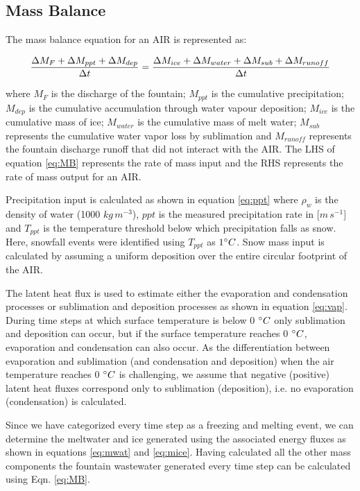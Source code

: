 \documentclass[utf8]{frontiersSCNS} %
\begin{document}
\subsection{Mass Balance}
The mass balance equation for an AIR is represented as:

\begin{equation}
	\frac{\Delta M_{F} + \Delta M_{ppt} + \Delta M_{dep}}{\Delta t} = \frac{\Delta M_{ice} +\Delta M_{water} +
		\Delta M_{sub} + \Delta M_{runoff}}{\Delta t}  \\
	\label{eq:MB}
\end{equation}

where $M_{F}$ is the discharge of the fountain; $M_{ppt}$ is the cumulative precipitation;  $M_{dep}$ is the cumulative
accumulation through water vapour deposition; $M_{ice}$ is the cumulative mass of ice; $M_{water}$ is the cumulative
mass of melt water; $M_{sub}$ represents the cumulative water vapor loss by sublimation and $M_{runoff}$ represents the
fountain discharge runoff that did not interact with the AIR. The LHS of equation \ref{eq:MB} represents the rate of
mass input and the RHS represents the rate of mass output for an AIR.

Precipitation input is calculated as shown in equation \ref{eq:ppt} where $\rho_{w}$ is the density of water (1000
$kg\,m^{-3}$), $ppt$ is the measured precipitation rate in [$m\,s^{-1}$] and $T_{ppt}$ is the temperature threshold
below which precipitation falls as snow. Here, snowfall events were identified using $T_{ppt}$ as $1 \degree C$. Snow
mass input is calculated by assuming a uniform deposition over the entire circular footprint of the AIR.

The latent heat flux is used to estimate either the evaporation and condensation processes or sublimation and deposition
processes as shown in equation \ref{eq:vap}. During time steps at which surface temperature is below 0 $\degree C$ only
sublimation and deposition can occur, but if the surface temperature reaches 0 $\degree C$, evaporation and condensation
can also occur. As the differentiation between evaporation and sublimation (and condensation and deposition) when the
air temperature reaches 0 $\degree C$ is challenging, we assume that negative (positive) latent heat fluxes correspond
only to sublimation (deposition), i.e. no evaporation (condensation) is calculated.

Since we have categorized every time step as a freezing and melting event, we can determine the meltwater and  ice
generated using the associated energy fluxes as shown in equations \ref{eq:mwat} and \ref{eq:mice}. Having
calculated all the other mass components the fountain wastewater generated every time step can be calculated using
Eqn. \ref{eq:MB}.
\end{document}
